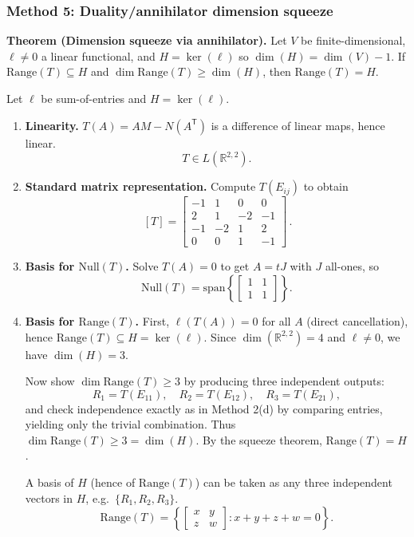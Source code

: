\documentclass[12pt]{article}
\newcommand{\R}{\mathbb{R}}
\begin{document}
\subsubsection{Method 5: Duality/annihilator dimension squeeze}
\textbf{Theorem (Dimension squeeze via annihilator).}
Let $V$ be finite-dimensional, $\ell\neq 0$ a linear functional, and $H=\ker(\ell)$ so $\dim(H)=\dim(V)-1$.
If $\mathrm{Range}(T)\subseteq H$ and $\dim\mathrm{Range}(T)\ge \dim(H)$, then $\mathrm{Range}(T)=H$.

Let $\ell$ be sum-of-entries and $H=\ker(\ell)$.

\medskip

\begin{enumerate}[label=(\alph*)]
\item \textbf{Linearity.}
$T(A)=AM-N(A^{\mathsf T})$ is a difference of linear maps, hence linear.
\[
\boxed{\,T\in L(\R^{2,2}).\,}
\]

\item \textbf{Standard matrix representation.}
Compute $T(E_{ij})$ to obtain
\[
\boxed{\, [T]=
\begin{bmatrix}
-1&1&0&0\\
2&1&-2&-1\\
-1&-2&1&2\\
0&0&1&-1
\end{bmatrix}\,}.
\]

\item \textbf{Basis for $\mathrm{Null}(T)$.}
Solve $T(A)=0$ to get $A=tJ$ with $J$ all-ones, so
\[
\boxed{\,\mathrm{Null}(T)=\mathrm{span}\left\{\begin{bmatrix}1&1\\1&1\end{bmatrix}\right\}.\,}
\]

\item \textbf{Basis for $\mathrm{Range}(T)$.}
First, $\ell(T(A))=0$ for all $A$ (direct cancellation), hence $\mathrm{Range}(T)\subseteq H=\ker(\ell)$.
Since $\dim(\R^{2,2})=4$ and $\ell\neq 0$, we have $\dim(H)=3$.

Now show $\dim\mathrm{Range}(T)\ge 3$ by producing three independent outputs:
\[
R_1=T(E_{11}),\quad R_2=T(E_{12}),\quad R_3=T(E_{21}),
\]
and check independence exactly as in Method 2(d) by comparing entries, yielding only the trivial combination.
Thus $\dim\mathrm{Range}(T)\ge 3=\dim(H)$.
By the squeeze theorem, $\mathrm{Range}(T)=H$.

A basis of $H$ (hence of $\mathrm{Range}(T)$) can be taken as any three independent vectors in $H$, e.g.\ $\{R_1,R_2,R_3\}$.
\[
\boxed{\,\mathrm{Range}(T)=\left\{\begin{bmatrix}x&y\\z&w\end{bmatrix}:x+y+z+w=0\right\}.\,}
\]


\end{enumerate}
\end{document}
